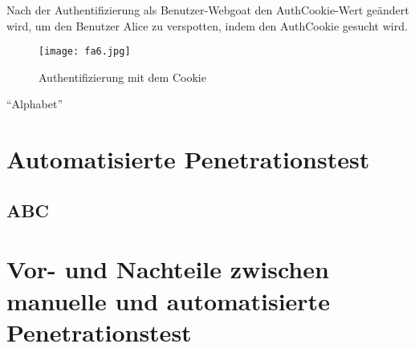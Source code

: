 Nach der Authentifizierung als Benutzer-Webgoat den AuthCookie-Wert geändert wird, um den Benutzer Alice zu verspotten, indem den AuthCookie gesucht wird.

\begin{figure}[h]
	\centering
	\texttt{[image: fa6.jpg]}
	\caption{Authentifizierung mit dem Cookie}
\end{figure}

"`Alphabet"'


\newpage

\section{Automatisierte Penetrationstest}



\subsection{ABC}

\section{Vor- und Nachteile zwischen manuelle und automatisierte Penetrationstest}